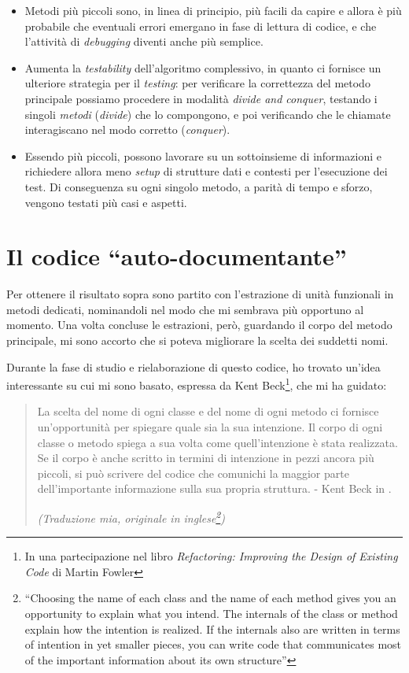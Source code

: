 \documentclass[12pt]{report}
\begin{document}
\begin{itemize}
  \item Metodi più piccoli sono, in linea di principio, più facili 
  da capire e allora è più probabile 
  che eventuali errori emergano in fase di lettura di codice,
  e che l'attività di \textit{debugging} diventi anche più semplice.
  \item Aumenta la \textit{testability} dell'algoritmo complessivo, in quanto
  ci fornisce un ulteriore strategia per il \textit{testing}: 
  per verificare la correttezza del metodo principale 
  possiamo procedere in modalità \textit{divide and conquer}, 
  testando i singoli \textit{metodi} (\textit{divide}) 
  che lo compongono, e poi verificando che le
  chiamate interagiscano nel modo corretto (\textit{conquer}).
  \item Essendo più piccoli, possono lavorare su un sottoinsieme 
  di informazioni e richiedere allora meno \textit{setup} 
  di strutture dati e contesti per l'esecuzione dei test. Di conseguenza
  su ogni singolo metodo, a parità di tempo e sforzo, vengono testati
  più casi e aspetti.
\end{itemize}

\section{Il codice ``auto-documentante''}

Per ottenere il risultato sopra sono partito con l'estrazione di unità 
funzionali in metodi dedicati, nominandoli nel modo che mi sembrava 
più opportuno al momento. Una volta concluse le estrazioni, però, guardando il
corpo del metodo principale, mi sono accorto che si poteva migliorare
la scelta dei suddetti nomi.

Durante la fase di studio e 
rielaborazione di questo codice, ho trovato un'idea interessante 
su cui mi sono basato, espressa da Kent Beck\footnote{
In una partecipazione nel libro \textit{Refactoring: Improving the 
Design of Existing Code} di Martin Fowler\cite{fowler2002}}, che 
mi ha guidato: 

\begin{quote}
	La scelta del nome di ogni classe e del nome di ogni metodo ci fornisce
	un'opportunità per spiegare quale sia la sua intenzione. Il corpo di
	ogni classe o metodo spiega a sua volta come quell'intenzione è stata
	realizzata. Se il corpo è anche scritto in termini di intenzione in
	pezzi ancora più piccoli, si può scrivere del codice che comunichi
	la maggior parte dell'importante informazione sulla sua propria struttura.
	- Kent Beck in \cite{fowler2002}.
	
	\flushright
	\textit{(Traduzione mia, originale in inglese\footnote{
			``Choosing the name of each class and the name of each method gives 
			you an opportunity to explain what you intend. The internals of the 
			class or method explain how the intention is realized. If the 
			internals also are written in terms of intention in yet smaller 
			pieces, you can write code that communicates most of the important 
			information about its own structure''
		})
	}
\end{quote}
\end{document}
